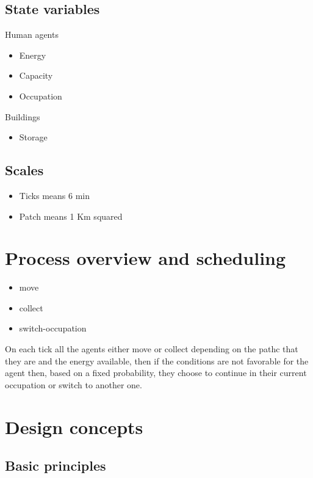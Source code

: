 \documentclass{wscpaperproc}
\theoremstyle{wsc}
\begin{document}
\subsection{State variables}

Human agents

\begin{itemize}
    \item Energy
    \item Capacity
    \item Occupation
\end{itemize}

Buildings

\begin{itemize}
    \item Storage
\end{itemize}

\subsection{Scales}

\begin{itemize}
    \item Ticks means 6 min
    \item Patch means 1 Km squared
\end{itemize}

\section{Process overview and scheduling}

\begin{itemize}
    \item move
    \item collect
    \item switch-occupation
\end{itemize}

On each tick all the agents either move or collect depending on the pathc that
they are and the energy available, then if the conditions are not favorable for
the agent then, based on a fixed probability, they choose to continue in their
current occupation or switch to another one.

\section{Design concepts}

\subsection{Basic principles}
\end{document}
